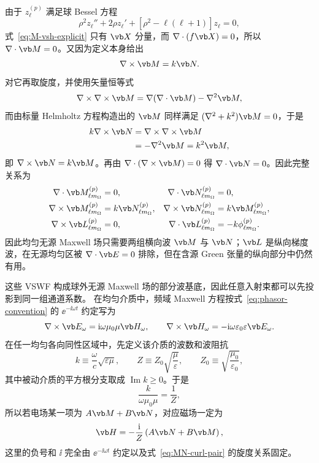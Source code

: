 由于 $z_\ell^{(p)}$ 满足球 Bessel 方程
\begin{equation}
\rho^2 z_\ell''+2\rho z_\ell'
+\left[\rho^2-\ell(\ell+1)\right]z_\ell=0,
\end{equation}
式~\cref{eq:M-vsh-explicit} 只有 $\vb X$ 分量，而 $\nabla\cdot(f\vb X)=0$，所以 $\nabla\cdot\vb M=0$。又因为定义本身给出
\begin{equation}
\nabla\times\vb M=k\vb N.
\end{equation}
对它再取旋度，并使用矢量恒等式
\begin{equation}
\nabla\times\nabla\times\vb M
=\nabla(\nabla\cdot\vb M)-\nabla^2\vb M,
\end{equation}
而由标量 Helmholtz 方程构造出的 $\vb M$ 同样满足 $(\nabla^2+k^2)\vb M=0$，于是
\begin{align}
k\nabla\times\vb N
&=\nabla\times\nabla\times\vb M\\
&=-\nabla^2\vb M=k^2\vb M,
\end{align}
即 $\nabla\times\vb N=k\vb M$。再由 $\nabla\cdot(\nabla\times\vb M)=0$ 得 $\nabla\cdot\vb N=0$。因此完整关系为
\begin{align}
\nabla\cdot\vb M_{\ell m_{\Omega}}^{(p)}
&=0,
&
\nabla\cdot\vb N_{\ell m_{\Omega}}^{(p)}
&=0,
\\
\nabla\times\vb M_{\ell m_{\Omega}}^{(p)}
&=k\vb N_{\ell m_{\Omega}}^{(p)},
&
\nabla\times\vb N_{\ell m_{\Omega}}^{(p)}
&=k\vb M_{\ell m_{\Omega}}^{(p)},
\label{eq:MN-curl-pair}
\\
\nabla\times\vb L_{\ell m_{\Omega}}^{(p)}
&=0,
&
\nabla\cdot\vb L_{\ell m_{\Omega}}^{(p)}
&=-k\phi_{\ell m_{\Omega}}^{(p)}.
\end{align}
因此均匀无源 Maxwell 场只需要两组横向波
$\vb M$ 与 $\vb N$；$\vb L$ 是纵向梯度波，在无源均匀区被
$\nabla\cdot\vb E=0$ 排除，但在含源 Green 张量的纵向部分中仍然有用。

这些 VSWF 构成球外无源 Maxwell 场的部分波基底，因此任意入射束都可以先投影到同一组通道系数。
在均匀介质中，频域 Maxwell 方程按式~\cref{eq:phasor-convention} 的
$\ee^{-\ii\omega t}$ 约定写为
\begin{equation}
\nabla\times\vb E_\omega=\ii\omega\mu_0\mu\vb H_\omega,
\qquad
\nabla\times\vb H_\omega=-\ii\omega\varepsilon_0\varepsilon\vb E_\omega.
\label{eq:frequency-maxwell-isotropic}
\end{equation}
在任一均匀各向同性区域中，先定义该介质的波数和波阻抗
\begin{equation}
 k\equiv\frac{\omega}{c}\sqrt{\varepsilon\mu},
 \qquad
 Z\equiv Z_0\sqrt{\frac{\mu}{\varepsilon}},
 \qquad
 Z_0\equiv\sqrt{\frac{\mu_0}{\varepsilon_0}},
 \label{eq:isotropic-k-Z-def}
\end{equation}
其中被动介质的平方根分支取成 $\operatorname{Im}k\ge0$。于是
\begin{equation}
\frac{k}{\omega\mu_0\mu}
=\frac{1}{Z},
\end{equation}
所以若电场某一项为 $A\vb M+B\vb N$，对应磁场一定为
\begin{equation}
\vb H
=-\frac{\ii}{Z}
\left(A\vb N+B\vb M\right),
\label{eq:H-from-E-MN}
\end{equation}
这里的负号和 $\ii$ 完全由 $\ee^{-\ii\omega t}$ 约定以及式~\cref{eq:MN-curl-pair} 的旋度关系固定。

